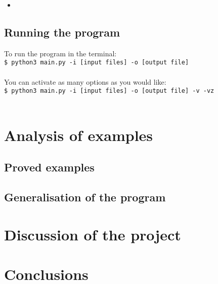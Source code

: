\documentclass[a4paper,12pt]{report}
\begin{document}
\begin{itemize}
 \item 
\end{itemize}

\section{Running the program}

To run the program in the terminal:\\ \texttt{\$ python3 main.py -i [input files] -o [output file]} \\\\ You can activate as many options as you would like:\\ \texttt{\$ python3 main.py -i [input files] -o [output file] -v -vz}\\\\



\chapter{Analysis of examples}

\section{Proved examples}

\section{Generalisation of the program}




\chapter{Discussion of the project}


\chapter{Conclusions}





\end{document}
